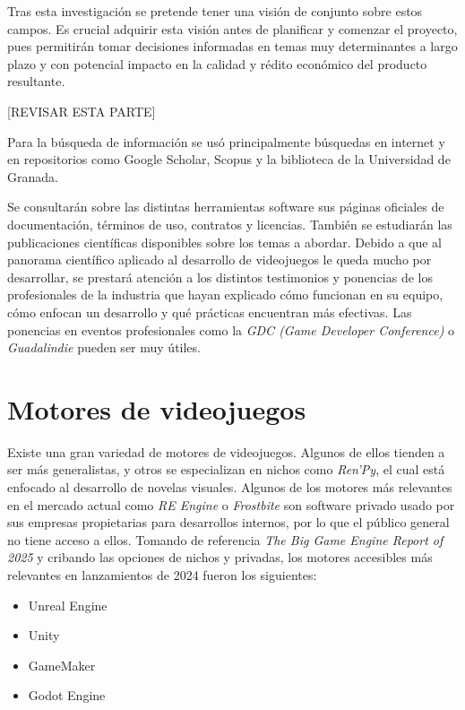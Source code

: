 Tras esta investigación se pretende tener una visión de conjunto sobre estos campos. Es crucial adquirir esta visión antes de planificar y comenzar el proyecto, pues permitirán tomar decisiones informadas en temas muy determinantes a largo plazo y con potencial impacto en la calidad y rédito económico del producto resultante.


[REVISAR ESTA PARTE]


Para la búsqueda de información se usó principalmente búsquedas en internet y en repositorios como Google Scholar, Scopus y la biblioteca de la Universidad de Granada.

Se consultarán sobre las distintas herramientas software sus páginas oficiales de documentación, términos de uso, contratos y licencias. También se estudiarán las publicaciones científicas disponibles sobre los temas a abordar. Debido a que al panorama científico aplicado al desarrollo de videojuegos le queda mucho por desarrollar, se prestará atención a los distintos testimonios y ponencias de los profesionales de la industria que hayan explicado cómo funcionan en su equipo, cómo enfocan un desarrollo y qué prácticas encuentran más efectivas. Las ponencias en eventos profesionales como la \textit{GDC (Game Developer Conference)} o \textit{Guadalindie} pueden ser muy útiles.

\section{Motores de videojuegos}

Existe una gran variedad de motores de videojuegos. Algunos de ellos tienden a ser más generalistas, y otros se especializan en nichos como \textit{Ren'Py}\cite{renpy}, el cual está enfocado al desarrollo de novelas visuales. Algunos de los motores más relevantes en el mercado actual como \textit{RE Engine} o \textit{Frostbite} son software privado usado por sus empresas propietarias para desarrollos internos, por lo que el público general no tiene acceso a ellos. Tomando de referencia \textit{The Big Game Engine Report of 2025}\cite{game-engine-report} y cribando las opciones de nichos y privadas, los motores accesibles más relevantes en lanzamientos de 2024 fueron los siguientes:

\begin{itemize}
    \item Unreal Engine
    \item Unity
    \item GameMaker
    \item Godot Engine
\end{itemize}

